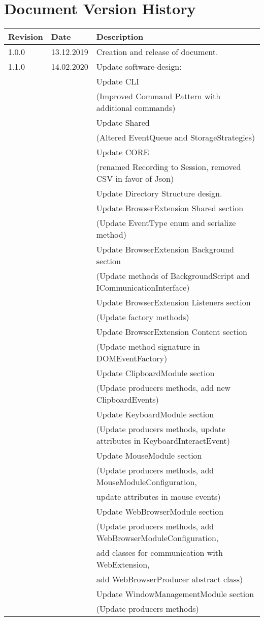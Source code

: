 \chapter*{Document Version History}
\label{ch:versionhistory}
\begin{table}[h]
\begin{tabular}{lll}
\textbf{Revision} & \textbf{Date} & \textbf{Description}              \\
\hline
1.0.0             & 13.12.2019    & Creation and release of document. \\
\hline
1.1.0			  & 14.02.2020	  & Update software-design: \\
&& Update CLI \\
&& (Improved Command Pattern with additional commands) \\
&& Update Shared \\
&& (Altered EventQueue and StorageStrategies) \\
&& Update CORE \\
&& (renamed Recording to Session, removed CSV in favor of Json) \\
&& Update Directory Structure design. \\                                                          
&& Update BrowserExtension Shared section\\
&& (Update EventType enum and serialize method)\\
&& Update BrowserExtension Background section\\
&& (Update methods of BackgroundScript and ICommunicationInterface)\\
&& Update BrowserExtension Listeners section\\
&& (Update factory methods)\\
&& Update BrowserExtension Content section\\
&& (Update method signature in DOMEventFactory)\\
&& Update ClipboardModule section\\
&& (Update producers methods, add new ClipboardEvents)\\
&& Update KeyboardModule section\\
&& (Update producers methods, update attributes in KeyboardInteractEvent)\\
&& Update MouseModule section\\
&& (Update producers methods, add MouseModuleConfiguration,\\
&& update attributes in mouse events)\\
&& Update WebBrowserModule section\\
&& (Update producers methods, add WebBrowserModuleConfiguration,\\
&& add classes for communication with WebExtension,\\
&& add WebBrowserProducer abstract class)\\
&& Update WindowManagementModule section\\
&& (Update producers methods)
\end{tabular}
\end{table}
